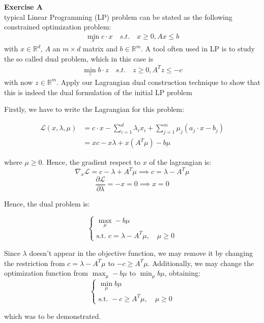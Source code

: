 \documentclass[11pt,table]{article}
\newenvironment{problem}[2][Exercise]
{ \begin{mdframed}[backgroundcolor=gray!20] \textbf{#1 #2} \\}
	{  \end{mdframed}}
\newcommand\R{\mathbb R}
\begin{document}
	\begin{problem}{8}
		A typical Linear Programming (LP) problem can be stated as the following constrained optimization problem:
		\begin{align*}
			\min_x c \cdot x \quad s.t. \quad x \geq 0, Ax \leq b
		\end{align*}
		with \(x \in \R^d\), \(A\) an \(m \times d\) matrix and \(b \in \R^m\). A tool often used in LP is to study the so called dual problem, which in this case is
		\begin{align*}
			\min_{z} b \cdot z \quad s.t. \quad z \geq 0, A^T z \leq -c
		\end{align*}
		with now \(z \in \R^m\). Apply our Lagrangian dual construction technique to show that this is indeed the dual formulation of the initial LP problem
	\end{problem}
	
	Firstly, we have to write the Lagrangian for this problem:
	
	\begin{align*}
		\mathcal L(x,\lambda,\mu) & = c \cdot x -  \sum_{i=1}^d \lambda_i x_i  + \sum_{j=1}^m \mu_j(a_j \cdot x - b_j) \\
		& = xc - x\lambda + x\left(A^T \mu\right) - b\mu
	\end{align*}
	
	where $\mu \ge 0$. Hence, the gradient respect to \(x\) of the lagrangian is:
	\[
	\nabla_x \mathcal L = c - \lambda + A^T \mu \implies c = \lambda - A^T\mu
	\]
	\[
	\frac{\partial \mathcal L}{\partial \lambda} = -x = 0 \implies x = 0
	\]
	
	Hence, the dual problem is:
	
	\[
	\begin{cases}
		\max_\mu - b \mu \\
		\text{s.t. } c = \lambda - A^T\mu, \quad \mu \ge 0
	\end{cases}
	\]
	
	Since $\lambda$ doesn't appear in the objective function, we may remove it by changing the restriction from $c = \lambda - A^T\mu$ to $-c \geq A^T\mu$. Additionally, we may change the optimization function from $\max_\mu - b \mu$ to $\min_\mu b \mu$, obtaining:
	\[
	\begin{cases}
		\min_\mu b \mu \\
		\text{s.t. } -c \ge A^T\mu, \quad \mu \ge 0
	\end{cases}
	\]
	
	which was to be demonstrated. \\
	
\end{document}
